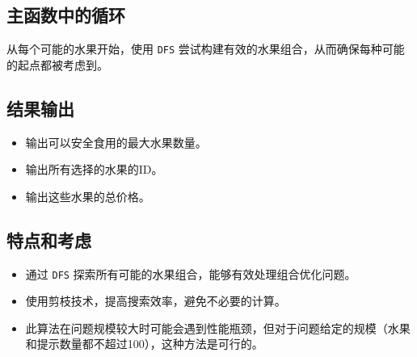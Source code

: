 \documentclass{ctexart} %
\begin{document}
\subsection*{主函数中的循环}
从每个可能的水果开始，使用 \texttt{DFS} 尝试构建有效的水果组合，从而确保每种可能的起点都被考虑到。

\subsection*{结果输出}
\begin{itemize}
    \item 输出可以安全食用的最大水果数量。
    \item 输出所有选择的水果的ID。
    \item 输出这些水果的总价格。
\end{itemize}

\subsection*{特点和考虑}
\begin{itemize}
    \item 通过 \texttt{DFS} 探索所有可能的水果组合，能够有效处理组合优化问题。
    \item 使用剪枝技术，提高搜索效率，避免不必要的计算。
    \item 此算法在问题规模较大时可能会遇到性能瓶颈，但对于问题给定的规模（水果和提示数量都不超过100），这种方法是可行的。
\end{itemize}
\end{document}
